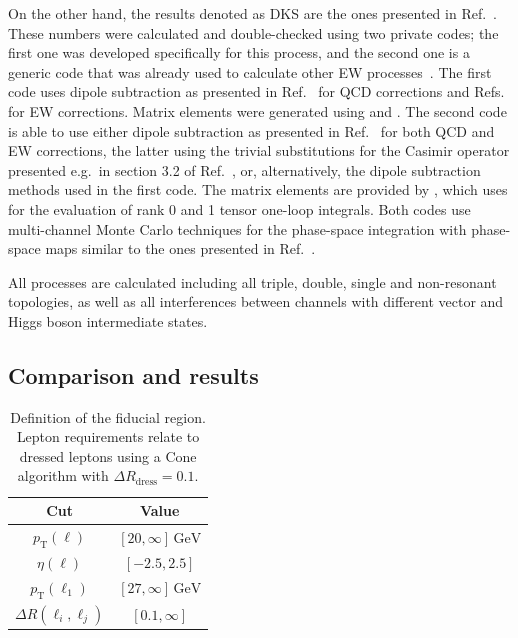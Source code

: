 On the other hand, the results denoted as DKS are the ones presented in Ref.~\cite{Dittmaier:2019twg}.
These numbers were calculated and double-checked using two private codes; the first one was developed specifically for this process, and the second one is a generic code that was already used to calculate other EW processes~\cite{Ballestrero:2018anz,Denner:2019tmn,Denner:2019zfp}.
The first code uses dipole subtraction as presented in Ref.~\cite{Catani:1996vz} for QCD corrections and Refs.~\cite{Dittmaier:1999mb,Dittmaier:2008md} for EW corrections.
Matrix elements were generated using \Madgraph \cite{Alwall:2014hca} and \Recola.
The second code is able to use either dipole subtraction as presented in Ref.~\cite{Catani:1996vz} for both QCD and EW corrections, the latter using the trivial substitutions for the Casimir operator presented e.g.\ in section 3.2 of Ref.~\cite{Kallweit:2014xda}, or, alternatively, the dipole subtraction methods used in the first code.
The matrix elements are provided by \OpenLoops \cite{Cascioli:2011va,Kallweit:2014xda,Buccioni:2019sur}, which uses \Collier \cite{Denner:2016kdg,Denner:2002ii,Denner:2005nn,Denner:2010tr} for the evaluation of rank 0 and 1 tensor one-loop integrals.
Both codes use multi-channel Monte Carlo techniques \cite{Hilgart:1992xu,Kleiss:1994qy} for the phase-space integration with phase-space maps similar to the ones presented in Ref.~\cite{Dittmaier:2002ap}.

All processes are calculated including all triple, double, 
single and non-resonant topologies, as well as all interferences 
between channels with different vector and Higgs boson intermediate
states.


\subsection{Comparison and results}
\label{sec:WWW:comparison}

\begin{table}[t!]
  \centering
  \begin{tabular}{c|c}
    Cut & Value \\\hline
    $p_\mathrm{T}(\ell)$ & $[20,\infty]\,\text{GeV}$ \\
    $\eta(\ell)$ & $[-2.5,2.5]$ \\
    $p_\mathrm{T}(\ell_1)$ & $[27,\infty]\,\text{GeV}$ \\
    $\Delta R(\ell_i,\ell_j)$ & $[0.1,\infty]$
  \end{tabular}
  \caption{
    Definition of the fiducial region. Lepton requirements relate 
    to dressed leptons using a Cone algorithm with $\Delta R_\text{dress}=0.1$.
    \label{tab:WWW:cuts}
  }
\end{table}


